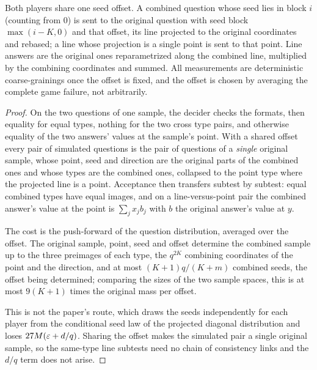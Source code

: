 \begin{lemma}
Both players share one seed offset. A combined question whose seed lies in block $i$ (counting
from $0$) is sent to the original question with seed block $\max(i-K,0)$ and that offset, its line
projected to the original coordinates and rebased; a line whose projection is a single point is
sent to that point. Line answers are the original ones reparametrized along the combined line,
multiplied by the combining coordinates and summed. All measurements are deterministic
coarse-grainings once the offset is fixed, and the offset is chosen by averaging the complete
game failure, not arbitrarily.
\end{lemma}

\begin{proof}
\leanok
On the two questions of one sample, the decider checks the formats, then equality for equal
types, nothing for the two cross type pairs, and otherwise equality of the two answers' values at
the sample's point. With a shared offset every pair of simulated questions is the pair of
questions of a \emph{single} original sample, whose point, seed and direction are the original
parts of the combined ones and whose types are the combined ones, collapsed to the point type
where the projected line is a point. Acceptance then transfers subtest by subtest: equal combined
types have equal images, and on a line-versus-point pair the combined answer's value at the point
is $\sum_j x_jb_j$ with $b$ the original answer's value at $y$.

The cost is the push-forward of the question distribution, averaged over the offset. The
original sample, point, seed and offset determine the combined sample up to the three
preimages of each type, the $q^{2K}$ combining coordinates of the point and the direction, and at
most $(K+1)q/(K+m)$ combined seeds, the offset being determined; comparing the sizes of the two
sample spaces, this is at most $9(K+1)$ times the original mass per offset.

This is not the paper's route, which draws the seeds independently for each player from the
conditional seed law of the projected diagonal distribution and loses $27M(\varepsilon+d/q)$. Sharing the
offset makes the simulated pair a single original sample, so the same-type line subtests need no
chain of consistency links and the $d/q$ term does not arise.
\end{proof}


